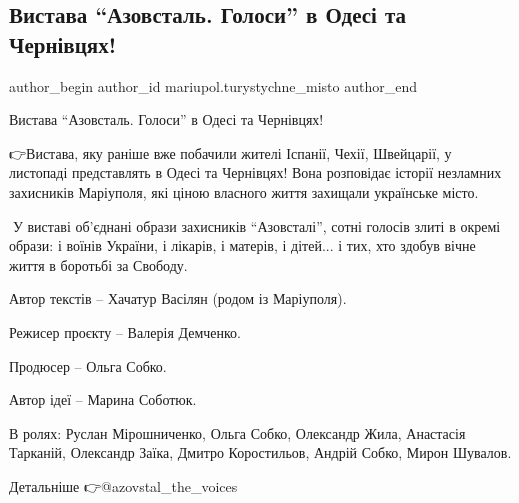  
 
 
 
 

\subsection{Вистава \enquote{Азовсталь. Голоси} в Одесі та Чернівцях!}
\label{sec:05_11_2023.fb.mariupol.turystychne_misto.1.vystava_azovstal_golosy_odesa_chernivci}

\ifcmt
 author_begin
   author_id mariupol.turystychne_misto
 author_end
\fi


Вистава \enquote{Азовсталь. Голоси} в Одесі та Чернівцях!

👉Вистава, яку раніше вже побачили жителі Іспанії, Чехії, Швейцарії, у
листопаді представлять в Одесі та Чернівцях! Вона розповідає історії незламних
захисників Маріуполя, які ціною власного життя захищали українське місто.

👥У виставі об'єднані образи захисників \enquote{Азовсталі}, сотні голосів злиті в
окремі образи: і воїнів України, і лікарів, і матерів, і дітей... і тих, хто
здобув вічне життя в боротьбі за Свободу.

Автор текстів – Хачатур Васілян (родом із Маріуполя).

Режисер проєкту – Валерія Демченко.

Продюсер – Ольга Собко.

Автор ідеї – Марина Соботюк.

В ролях: Руслан Мірошниченко, Ольга Собко, Олександр Жила, Анастасія Тарканій,
Олександр Заїка, Дмитро Коростильов, Андрій Собко, Мирон Шувалов.

Детальніше 👉@azovstal\_the\_voices
